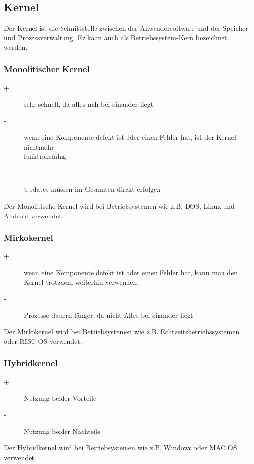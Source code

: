 \documentclass[12pt,a4paper]{article}
\begin{document}
\subsection{Kernel}
    Der Kernel ist die Schnittstelle zwischen der Anwendersoftware und der Speicher- und Prozessverwaltung. Er kann auch als Betriebssystem-Kern bezeichnet werden.

\subsubsection{Monolitischer Kernel}
	\begin{description}
    	\item[+]{sehr schnell, da alles nah bei einander liegt}
    	\item[-]{wenn eine Komponente defekt ist oder einen Fehler hat, ist der Kernel nichtmehr \\ funktionsfähig}
    	\item[-]{Updates müssen im Gesamten direkt erfolgen}
	\end{description}
    Der Monolitische Kernel wird bei Betriebsystemen wie z.B. DOS, Linux und Android verwendet.

\subsubsection{Mirkokernel}
	\begin{description}
    	\item[+]{wenn eine Komponente defekt ist oder einen Fehler hat, kann man den Kernel trotzdem weiterhin 							 verwenden}
    	\item[-]{Prozesse dauern länger, da nicht Alles bei einander liegt}
	\end{description}
    Der Mirkokernel wird bei Betriebsystemen wie z.B. Echtzeitsbetriebssystemen oder RISC OS verwendet.

\subsubsection{Hybridkernel}
	\begin{description}
    	\item[+]{Nutzung beider Vorteile}
    	\item[-]{Nutzung beider Nachteile}
	\end{description}
    Der Hybridkernel wird bei Betriebsystemen wie z.B. Windows oder MAC OS verwendet.
\end{document}
